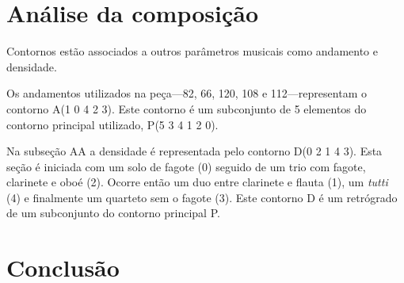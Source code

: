 \documentclass[12pt,brazil]{book}
\newcommand{\eng}[1]{\textit{#1}}
\begin{document}
\chapter{Análise da composição}
\label{cha:anal-da-comp}

Contornos estão associados a outros parâmetros musicais como andamento
e densidade.

Os andamentos utilizados na peça---82, 66, 120, 108 e
112---representam o contorno A(1 0 4 2 3). Este contorno é um
subconjunto de 5 elementos do contorno principal utilizado, P(5 3 4 1
2 0).

Na subseção AA a densidade é representada pelo contorno D(0 2 1 4
3). Esta seção é iniciada com um solo de fagote (0) seguido de um trio
com fagote, clarinete e oboé (2). Ocorre então um duo entre clarinete
e flauta (1), um \eng{tutti} (4) e finalmente um quarteto sem o fagote
(3). Este contorno D é um retrógrado de um subconjunto do contorno
principal P.

\chapter{Conclusão}
\label{cha:conclusao}






\printglossary[title=Glossário]
\end{document}

